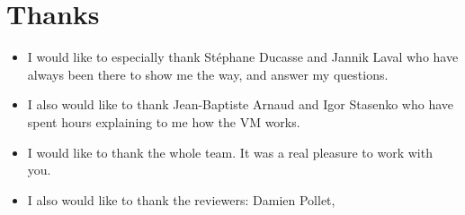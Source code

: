 \section*{Thanks}
\begin{itemize}
	\item[] \hspace{-0.5cm}I would like to especially thank St\'{e}phane Ducasse and Jannik Laval who have always been there to show me the way, and answer my questions.
	\item[] \hspace{-0.5cm}I also would like to thank Jean-Baptiste Arnaud and Igor Stasenko who have spent hours explaining to me how the VM works.
	\item[] \hspace{-0.5cm}I would like to thank the whole team. It was a real pleasure to work with you.
	\item[] \hspace{-0.5cm}I also would like to thank the reviewers: Damien Pollet, 
\end{itemize}